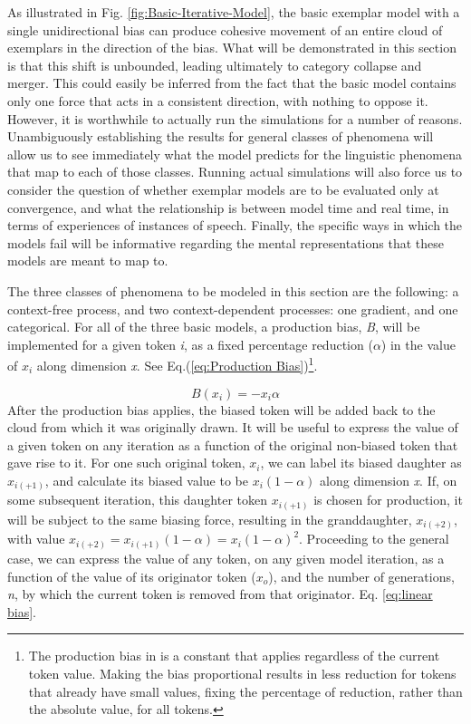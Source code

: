 As illustrated in Fig. \ref{fig:Basic-Iterative-Model}, the basic
exemplar model with a single unidirectional bias can produce cohesive
movement of an entire cloud of exemplars in the direction of the bias.
What will be demonstrated in this section is that this shift is unbounded,
leading ultimately to category collapse and merger. This could easily
be inferred from the fact that the basic model contains only one force
that acts in a consistent direction, with nothing to oppose it. However,
it is worthwhile to actually run the simulations for a number of reasons.
Unambiguously establishing the results for general classes of phenomena
will allow us to see immediately what the model predicts for the linguistic
phenomena that map to each of those classes. Running actual simulations
will also force us to consider the question of whether exemplar models
are to be evaluated only at convergence, and what the relationship
is between model time and real time, in terms of experiences of instances
of speech. Finally, the specific ways in which the models fail will
be informative regarding the mental representations that these models
are meant to map to. 

The three classes of phenomena to be modeled in this section are the
following: a context-free process, and two context-dependent processes:
one gradient, and one categorical. For all of the three basic models,
a production bias, \emph{B}, will be implemented for a given token
\emph{i}, as a fixed percentage reduction ($\alpha$) in the value
of \emph{$x_{i}$} along dimension \emph{x}. See Eq.(\ref{eq:Production Bias})\footnote{The production bias in \citet{Pierrehumbert2000} is a constant that
applies regardless of the current token value. Making the bias proportional
results in less reduction for tokens that already have small values,
fixing the percentage of reduction, rather than the absolute value,
for all tokens.}. 

\begin{equation}
B(x_{i})=-x_{i}\alpha\label{eq:Production Bias}
\end{equation}
After the production bias applies, the biased token will be added
back to the cloud from which it was originally drawn. It will be useful
to express the value of a given token on any iteration as a function
of the original non-biased token that gave rise to it. For one such
original token, $x_{i}$, we can label its biased daughter as $x_{i(+1)}$,
and calculate its biased value to be $x_{i}\left(1-\alpha\right)$
along dimension \emph{x}. If, on some subsequent iteration, this daughter
token $x_{i(+1)}$ is chosen for production, it will be subject to
the same biasing force, resulting in the granddaughter, $x_{i(+2)}$,
with value $x_{i(+2)}=x_{i(+1)}\left(1-\alpha\right)=x_{i}\left(1-\alpha\right)^{2}$.
Proceeding to the general case, we can express the value of any token,
on any given model iteration, as a function of the value of its originator
token ($x_{o}$), and the number of generations, \emph{n}, by which
the current token is removed from that originator. Eq. \ref{eq:linear bias}. 

